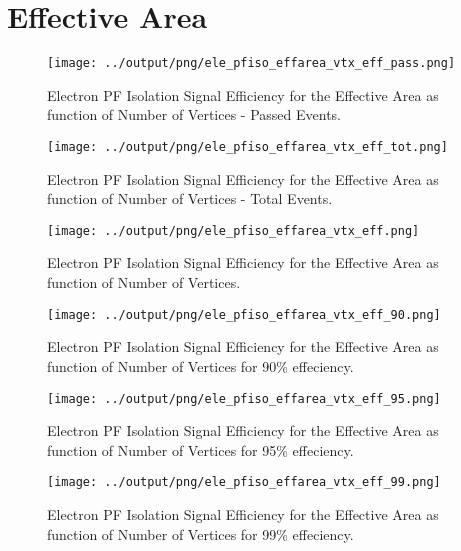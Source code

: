 \documentclass[11pt]{book}
\begin{document}
\section{Effective Area}
\begin{figure}[htb]
\centering
\texttt{[image: ../output/png/ele\_pfiso\_effarea\_vtx\_eff\_pass.png]}
\caption{Electron PF Isolation Signal Efficiency for the Effective Area as function of Number of Vertices - Passed Events.}
\label{fig:ele_pfiso_vtx_eff_effarea_pass}
\end{figure}

\begin{figure}[htb]
\centering
\texttt{[image: ../output/png/ele\_pfiso\_effarea\_vtx\_eff\_tot.png]}
\caption{Electron PF Isolation Signal Efficiency for the Effective Area as function of Number of Vertices - Total Events.}
\label{fig:ele_pfiso_vtx_eff_effarea_tot}
\end{figure}

\begin{figure}[htb]
\centering
\texttt{[image: ../output/png/ele\_pfiso\_effarea\_vtx\_eff.png]}
\caption{Electron PF Isolation Signal Efficiency for the Effective Area as function of Number of Vertices.}
\label{fig:ele_pfiso_vtx_eff_effarea}
\end{figure}

\begin{figure}[htb]
\centering
\texttt{[image: ../output/png/ele\_pfiso\_effarea\_vtx\_eff\_90.png]}
\caption{Electron PF Isolation Signal Efficiency for the Effective Area as function of Number of Vertices for 90\% effeciency.}
\label{fig:ele_pfiso_vtx_eff_effarea_eff_90}
\end{figure}

\begin{figure}[htb]
\centering
\texttt{[image: ../output/png/ele\_pfiso\_effarea\_vtx\_eff\_95.png]}
\caption{Electron PF Isolation Signal Efficiency for the Effective Area as function of Number of Vertices for 95\% effeciency.}
\label{fig:ele_pfiso_vtx_eff_effarea_eff_95}
\end{figure}

\begin{figure}[htb]
\centering
\texttt{[image: ../output/png/ele\_pfiso\_effarea\_vtx\_eff\_99.png]}
\caption{Electron PF Isolation Signal Efficiency for the Effective Area as function of Number of Vertices for 99\% effeciency.}
\label{fig:ele_pfiso_vtx_eff_effarea_eff_99}
\end{figure}
\end{document}
